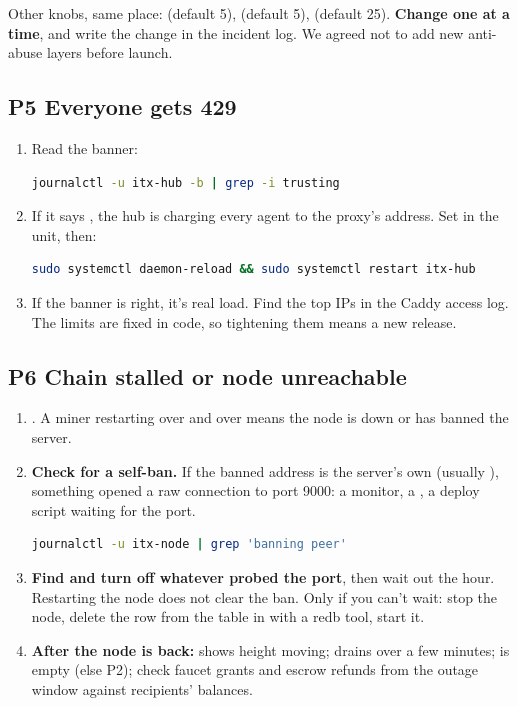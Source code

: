 \documentclass[11pt]{article}
\begin{document}
Other knobs, same place:  (default 5),  (default 5),  (default 25). \textbf{Change one at a time}, and write the change in the incident log. We agreed not to add new anti-abuse layers before launch.

\subsection{P5 Everyone gets 429}

\begin{enumerate}[leftmargin=1.5em]
  \item Read the banner:
\begin{lstlisting}[language=bash]
journalctl -u itx-hub -b | grep -i trusting
\end{lstlisting}
  \item If it says , the hub is charging every agent to the proxy's address. Set  in the unit, then:
\begin{lstlisting}[language=bash]
sudo systemctl daemon-reload && sudo systemctl restart itx-hub
\end{lstlisting}
  \item If the banner is right, it's real load. Find the top IPs in the Caddy access log. The limits are fixed in code, so tightening them means a new release.
\end{enumerate}

\subsection{P6 Chain stalled or node unreachable}

\begin{enumerate}[leftmargin=1.5em]
  \item {}. A miner restarting over and over means the node is down or has banned the server.
  \item \textbf{Check for a self-ban.} If the banned address is the server's own (usually ), something opened a raw connection to port 9000: a monitor, a , a deploy script waiting for the port.
\begin{lstlisting}[language=bash]
journalctl -u itx-node | grep 'banning peer'
\end{lstlisting}
  \item \textbf{Find and turn off whatever probed the port}, then wait out the hour. Restarting the node does not clear the ban. Only if you can't wait: stop the node, delete the row from the  table in  with a redb tool, start it.
  \item \textbf{After the node is back:}  shows height moving;  drains over a few minutes;  is empty (else P2); check faucet grants and escrow refunds from the outage window against recipients' balances.
\end{enumerate}
\end{document}
